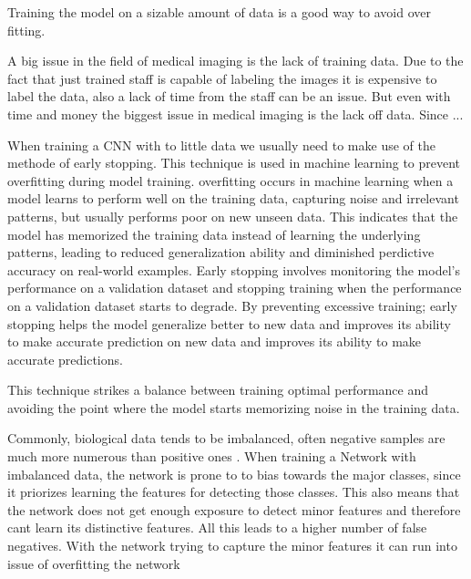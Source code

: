 \documentclass[
a4paper, 
12pt,
grayscalebody, %
abstract=on,
twoside, BCOR10mm, 12pt, DIV13,headinclude, footexclude, final, abstracton, openright
]{ibireprt}
\numberwithin{equation}{chapter}
\numberwithin{table}{chapter}
\numberwithin{figure}{chapter}
\numberwithin{algorithm}{chapter}
\numberwithin{example}{chapter}
\numberwithin{example}{chapter}
\begin{document}

Training the model on a sizable amount of data is a good way to avoid over fitting. 

A big issue in the field of medical imaging is the lack of training data. Due to the fact that just trained staff is capable of labeling the images it is expensive to label the data, also a lack of time from the staff can be an issue. But even with time and money the biggest issue in medical imaging is the lack off data. Since ... %

 When training a CNN with to little data we usually need to make use of the methode of early stopping. This technique is used in machine learning to prevent overfitting during model training. overfitting occurs in machine learning when a model learns to perform well on the training data, capturing noise and irrelevant patterns, but usually performs poor on new unseen data. This indicates that the model has memorized the training data instead of learning the underlying patterns, leading to reduced generalization ability and diminished perdictive accuracy on real-world examples. Early stopping involves monitoring the model's performance on a validation dataset and stopping training when the performance on a validation dataset starts to degrade. By preventing excessive training; early stopping helps the model generalize better to new data and improves its ability to make accurate prediction on new data and improves its ability to make accurate predictions.
 
 
  This technique strikes a balance between training optimal performance and avoiding the point where the model starts memorizing noise in the training data. %
 
 Commonly, biological data tends to be imbalanced, often negative samples are much more numerous than positive ones \cite{Alzubaidi2021}. When training a Network with imbalanced data, the network is prone to to bias towards the major classes, since it priorizes learning the features for detecting those classes. This also means that the network does not get enough exposure to detect minor features and therefore cant learn its distinctive features. All this leads to a higher number of false negatives. With the network trying to capture the minor features it can run into issue of overfitting the network %
 
\end{document}
